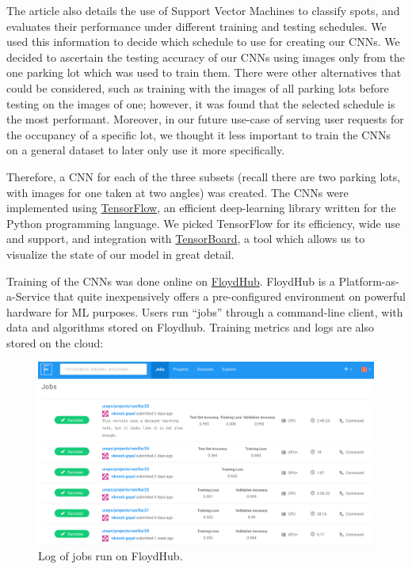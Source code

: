 \documentclass[a4paper, 11pt]{article} %
\begin{document}
    The article also details the use of Support Vector Machines to classify spots, and evaluates their 
    performance under different training and testing schedules. We used this information to decide 
    which schedule to use for creating our CNNs. We decided to ascertain the testing accuracy 
    of 
    our CNNs using images only from the one parking lot which was used to train them. There were 
    other 
    alternatives that could be considered, such as training with the images of all parking lots before 
    testing on the images of one; however, it was found that the selected schedule is the 
    most performant. Moreover, in our future use-case of serving user requests for the occupancy of a 
    specific lot, we thought it less important to train the CNNs on a general dataset to later only use it 
    more 
    specifically.
        
    Therefore, a CNN for each of the three subsets (recall there are two parking lots, with images for 
    one taken at two angles) was created. The CNNs were implemented using 
    \href{https://www.tensorflow.org}{TensorFlow}, an efficient deep-learning library written for the 
    Python programming language. We picked TensorFlow for its efficiency, wide use and support, and 
    integration with  
    \href{https://www.tensorflow.org/programmers_guide/summaries_and_tensorboard}{TensorBoard}, a 
    tool which allows us to visualize the state of our model in great detail.
    
    Training  of the CNNs was done online on \href{https://www.floydhub.com}{FloydHub}. FloydHub is 
    a Platform-as-a-Service that quite inexpensively offers a pre-configured environment on powerful 
    hardware for ML purposes. Users run ``jobs'' through a command-line client, with data and 
    algorithms stored on Floydhub. Training metrics and logs are also stored on the cloud: 
    \vskip 5mm
    \begin{figure}[h]
    	\centering
    	\includegraphics[width=14cm]{figures/floydhub.png}
    	\caption{Log of jobs run on FloydHub.}
    \end{figure}
    
\end{document}

